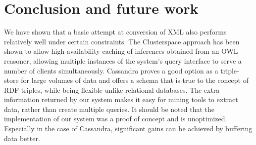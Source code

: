 \documentclass[journal]{IEEEtran}
\begin{document}
%
%
%

\section{Conclusion and future work}
We have shown that a basic attempt at conversion of XML also performs
relatively well under certain constraints. The Clusterspace approach has been
shown to allow high-availability caching of inferences obtained from an OWL
reasoner, allowing multiple instances of the system's query interface to serve
a number of clients simultaneously. Cassandra proves a good option as
a triple-store for large volumes of data and offers a schema that is true to
the concept of RDF triples, while being flexible unlike relational databases.
The extra information returned by our system makes it easy for mining tools to
extract data, rather than create multiple queries. It should be noted that the
implementation of our system was a proof of concept and is unoptimized.
Especially in the case of Cassandra, significant gains can be achieved by
buffering data better.
\end{document}
